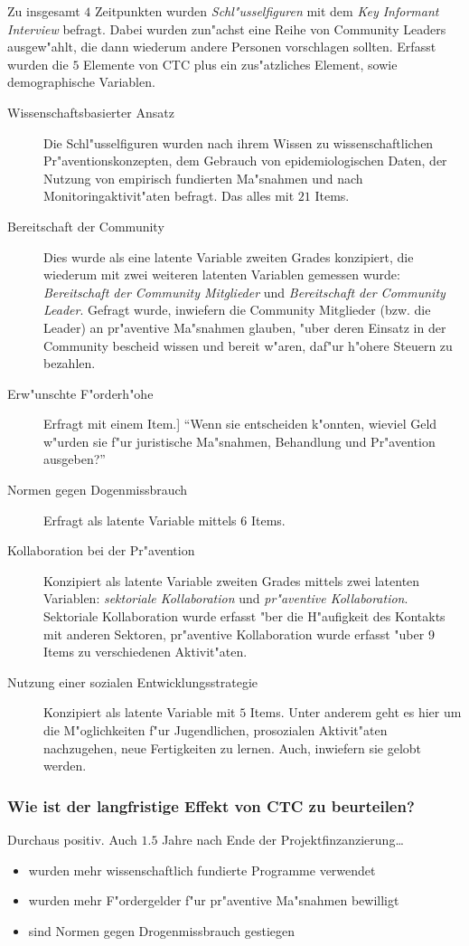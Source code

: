 Zu insgesamt $4$ Zeitpunkten wurden \emph{Schl"usselfiguren} mit dem \emph{Key Informant Interview} befragt. Dabei wurden zun"achst eine Reihe von Community Leaders ausgew"ahlt, die dann wiederum andere Personen vorschlagen sollten. Erfasst wurden die $5$ Elemente von CTC plus ein zus"atzliches Element, sowie demographische Variablen.

\begin{description}
        \item[Wissenschaftsbasierter Ansatz] Die Schl"usselfiguren wurden nach ihrem Wissen zu wissenschaftlichen Pr"aventionskonzepten, dem Gebrauch von epidemiologischen Daten, der Nutzung von empirisch fundierten Ma"snahmen und nach Monitoringaktivit"aten befragt. Das alles mit $21$ Items.
        \item[Bereitschaft der Community] Dies wurde als eine latente Variable zweiten Grades konzipiert, die wiederum mit zwei weiteren latenten Variablen gemessen wurde: \emph{Bereitschaft der Community Mitglieder} und \emph{Bereitschaft der Community Leader}. Gefragt wurde, inwiefern die Community Mitglieder (bzw. die Leader) an pr"aventive Ma"snahmen glauben, "uber deren Einsatz in der Community bescheid wissen und bereit w"aren, daf"ur h"ohere Steuern zu bezahlen. 
        \item[Erw"unschte F"orderh"ohe] Erfragt mit einem Item.] ``Wenn sie entscheiden k"onnten, wieviel Geld w"urden sie f"ur juristische Ma"snahmen, Behandlung und Pr"avention ausgeben?''
        \item[Normen gegen Dogenmissbrauch] Erfragt als latente Variable mittels $6$ Items.
        \item[Kollaboration bei der Pr"avention] Konzipiert als latente Variable zweiten Grades mittels zwei latenten Variablen: \emph{sektoriale Kollaboration} und \emph{pr"aventive Kollaboration}. Sektoriale Kollaboration wurde erfasst "ber die H"aufigkeit des Kontakts mit anderen Sektoren, pr"aventive Kollaboration wurde erfasst "uber 9 Items zu verschiedenen Aktivit"aten.
        \item[Nutzung einer sozialen Entwicklungsstrategie] Konzipiert als latente Variable mit $5$ Items. Unter anderem geht es hier um die M"oglichkeiten f"ur Jugendlichen, prosozialen Aktivit"aten nachzugehen, neue Fertigkeiten zu lernen. Auch, inwiefern sie gelobt werden. 
\end{description}

\subsubsection{Wie ist der langfristige Effekt von CTC zu beurteilen?}
Durchaus positiv. Auch $1.5$ Jahre nach Ende der Projektfinzanzierung\ldots
\begin{itemize}
        \item wurden mehr wissenschaftlich fundierte Programme verwendet
        \item wurden mehr F"ordergelder f"ur pr"aventive Ma"snahmen bewilligt
        \item sind Normen gegen Drogenmissbrauch gestiegen
\end{itemize}

